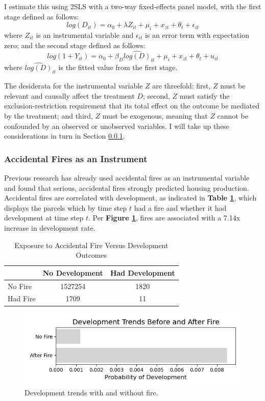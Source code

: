 \documentclass[a4paper,12pt]{article}
\begin{document}
I estimate this using 2SLS with a two-way fixed-effects panel model, with the first stage defined as follows:
\[
log(D_{it}) = \alpha_{0} + \lambda Z_{it} + \mu_{i} + x_{zt} + \theta_t + \epsilon_{it}
\]
where $Z_{it}$ is an instrumental variable and $\epsilon_{it}$ is an error term with expectation zero; and the second stage defined as follows:
\[
log(1 + Y_{it}) = \alpha_0 + \beta_D \hat{log(D)}_{it} + \mu_i + x_{zt} + \theta_t + u_{it} 
\]
where $\hat{log(D)}_{it}$ is the fitted value from the first stage.

The desiderata for the instrumental variable $Z$ are threefold: first, $Z$ must be relevant and causally affect the treatment $D$; second, $Z$ must satisfy the exclusion-restriction requirement that its total effect on the outcome be mediated by the treatment; and third, $Z$ must be exogenous, meaning that $Z$ cannot be confounded by an observed or unobserved variables. I will take up these considerations in turn in Section \ref{fires.instrumnet}.

\subsubsection{Accidental Fires as an Instrument}
\label{fires.instrumnet}
Previous research has already used accidental fires as an instrumental variable and found that serious, accidental fires strongly predicted housing production.\cite{pennington2021does} Accidental fires are correlated with development, as indicated in \textbf{Table \ref{table:fire_vs_development_punnett}}, which displays the parcels which by time step $t$ had a fire and whether it had development at time step $t$.  Per \textbf{Figure \ref{fig:fires.dev}}, fires are associated with a 7.14x increase in development rate.

\begin{table}[hbt]
    \centering
    \caption{Exposure to Accidental Fire Versus Development Outcomes}
    \setlength{\tabcolsep}{10pt} 
    \label{table:fire_vs_development_punnett}
    \begin{tabular}{lcc}
        \hline
         & No Development & Had Development \\
        \hline
        No Fire & 1527254 & 1820 \\
        Had Fire & 1709 & 11 \\
        \hline
    \end{tabular}
\end{table}

\begin{figure}[hbt]
    \centering
    \includegraphics[scale=.8]{iv/dev_fire_fstat.png}
    \caption{Development trends with and without fire.}
    \label{fig:fires.dev}
\end{figure}
\end{document}
